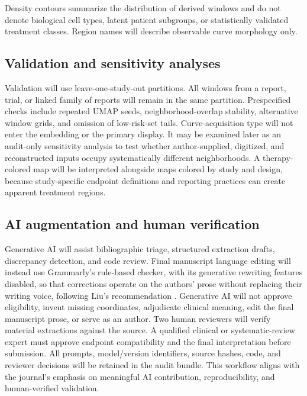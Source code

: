 \documentclass[17pt]{extarticle}
\begin{document}
Density contours summarize the distribution of derived windows and do not denote biological cell types, latent patient subgroups, or statistically validated treatment classes. Region names will describe observable curve morphology only.

\subsection{Validation and sensitivity analyses}

Validation will use leave-one-study-out partitions. All windows from a report, trial, or linked family of reports will remain in the same partition. Prespecified checks include repeated UMAP seeds, neighborhood-overlap stability, alternative window grids, and omission of low-risk-set tails. Curve-acquisition type will not enter the embedding or the primary display. It may be examined later as an audit-only sensitivity analysis to test whether author-supplied, digitized, and reconstructed inputs occupy systematically different neighborhoods. A therapy-colored map will be interpreted alongside maps colored by study and design, because study-specific endpoint definitions and reporting practices can create apparent treatment regions.

\subsection{AI augmentation and human verification}

Generative AI will assist bibliographic triage, structured extraction drafts, discrepancy detection, and code review. Final manuscript language editing will instead use Grammarly's rule-based checker, with its generative rewriting features disabled, so that corrections operate on the authors' prose without replacing their writing voice, following Liu's recommendation \citep{liu2024grammarly}. Generative AI will not approve eligibility, invent missing coordinates, adjudicate clinical meaning, edit the final manuscript prose, or serve as an author. Two human reviewers will verify material extractions against the source. A qualified clinical or systematic-review expert must approve endpoint compatibility and the final interpretation before submission. All prompts, model/version identifiers, source hashes, code, and reviewer decisions will be retained in the audit bundle. This workflow aligns with the journal's emphasis on meaningful AI contribution, reproducibility, and human-verified validation.
\end{document}
